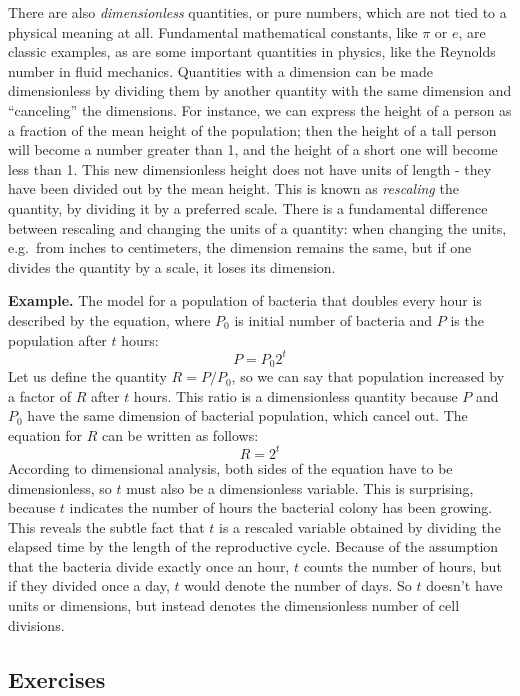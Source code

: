 \documentclass[
]{book}
\theoremstyle{definition}
\theoremstyle{definition}
\theoremstyle{definition}
\theoremstyle{remark}
\begin{document}
There are also  \emph{dimensionless} quantities, or pure numbers, which are not tied to a physical meaning at all. Fundamental mathematical constants, like \(\pi\) or \(e\), are classic examples, as are some important quantities in physics, like the Reynolds number in fluid mechanics. \citep{strogatz_nonlinear_2001} Quantities with a dimension can be made dimensionless by dividing them by another quantity with the same dimension and ``canceling'' the dimensions. For instance, we can express the height of a person as a fraction of the mean height of the population; then the height of a tall person will become a number greater than 1, and the height of a short one will become less than 1. This new dimensionless height does not have units of length - they have been divided out by the mean height. This is known as  \emph{rescaling} the quantity, by dividing it by a preferred scale. There is a fundamental difference between rescaling and changing the units of a quantity: when changing the units, e.g.~from inches to centimeters, the dimension remains the same, but if one divides the quantity by a scale, it loses its dimension.

\textbf{Example.} The model for a population of bacteria that doubles every hour is described by the equation, where \(P_0\) is initial number of bacteria and \(P\) is the population after \(t\) hours:
\[ P = P_0 2^t \]
Let us define the quantity \(R=P/P_0\), so we can say that population increased by a factor of \(R\) after \(t\) hours. This ratio is a dimensionless quantity because \(P\) and \(P_0\) have the same dimension of bacterial population, which cancel out. The equation for \(R\) can be written as follows:
\[ R= 2^t \]
According to dimensional analysis, both sides of the equation have to be dimensionless, so \(t\) must also be a dimensionless variable. This is surprising, because \(t\) indicates the number of hours the bacterial colony has been growing. This reveals the subtle fact that \(t\) is a rescaled variable obtained by dividing the elapsed time by the length of the reproductive cycle. Because of the assumption that the bacteria divide exactly once an hour, \(t\) counts the number of hours, but if they divided once a day, \(t\) would denote the number of days. So \(t\) doesn't have units or dimensions, but instead denotes the dimensionless number of cell divisions.

\hypertarget{exercises-1}{%
\subsection{Exercises}\label{exercises-1}}
\end{document}
